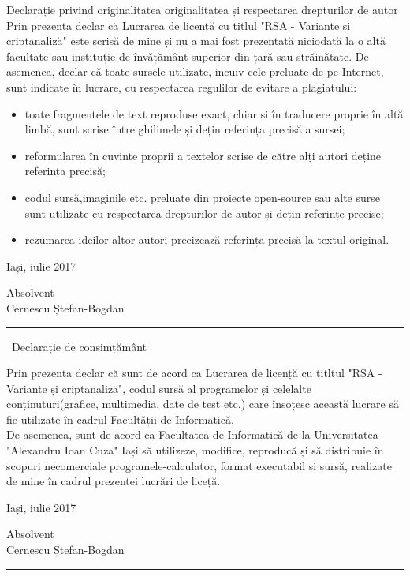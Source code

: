 \documentclass[12pt, oneside]{book}
\begin{document}
\vspace{1cm}
{ \Huge \center Declarație privind originalitatea originalitatea și respectarea drepturilor de autor} \\

Prin prezenta declar că Lucrarea de licență cu titlul "RSA - Variante și criptanaliză" este scrisă de mine și nu a mai fost prezentată niciodată la o altă facultate sau instituție de învățământ superior din țară sau străinătate. De asemenea, declar că toate sursele utilizate, incuiv cele preluate de pe Internet, sunt indicate în lucrare, cu respectarea regulilor de evitare a plagiatului:
\begin{itemize}
\item toate fragmentele de text reproduse exact, chiar și în traducere proprie în altă limbă, sunt scrise între ghilimele și dețin referința precisă a sursei;
\item reformularea în cuvinte proprii a textelor scrise de către alți autori deține referința precisă;
\item codul sursă,imaginile etc. preluate din proiecte open-source sau alte surse sunt utilizate cu respectarea drepturilor de autor și dețin referințe precise;
\item rezumarea ideilor altor autori precizează referința precisă la textul original.
\end{itemize} 
\vspace{1cm}
\begin{flushleft}
Iași, iulie 2017
\end{flushleft}
\begin{flushright}
Absolvent \\
Cernescu Ștefan-Bogdan \\
\vspace{0.5cm}
\noindent\rule{4cm}{0.4pt}
\end{flushright}
\clearpage

\vspace*{1cm}
{\Huge \ Declarație de consimțământ} \\
\vspace{1cm}


Prin prezenta declar că sunt de acord ca Lucrarea de licență cu titltul "RSA - Variante și criptanaliză", codul sursă al programelor și celelalte conținuturi(grafice, multimedia, date de test etc.) care însoțesc această lucrare să fie utilizate în cadrul Facultății de Informatică. \\
De asemenea, sunt de acord ca Facultatea de Informatică de la Universitatea "Alexandru Ioan Cuza" Iași să utilizeze, modifice, reproducă și să distribuie în scopuri necomerciale programele-calculator, format executabil și sursă, realizate de mine în cadrul prezentei lucrări de liceță.
\vspace{1cm}
\begin{flushleft}
Iași, iulie 2017
\end{flushleft}
\begin{flushright}
Absolvent \\
Cernescu Ștefan-Bogdan \\
\vspace{0.5cm}
\noindent\rule{4cm}{0.4pt}
\end{flushright}
\tableofcontents
\clearpage
\end{document}
